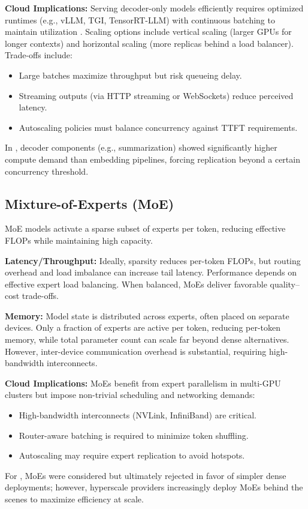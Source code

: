 \textbf{Cloud Implications:} Serving decoder-only models efficiently requires optimized runtimes (e.g., vLLM, TGI, TensorRT-LLM) with continuous batching to maintain utilization \cite{Kwon2023vLLM,tgi_docs,tensorrt_llm_docs}. Scaling options include vertical scaling (larger GPUs for longer contexts) and horizontal scaling (more replicas behind a load balancer). Trade-offs include: 
\begin{itemize}
  \item Large batches maximize throughput but risk queueing delay. 
  \item Streaming outputs (via HTTP streaming or WebSockets) reduce perceived latency.
  \item Autoscaling policies must balance concurrency against TTFT requirements.
\end{itemize}
In \ishtar{}, decoder components (e.g., summarization) showed significantly higher compute demand than embedding pipelines, forcing replication beyond a certain concurrency threshold.

\subsection{Mixture-of-Experts (MoE)}
MoE models activate a sparse subset of experts per token, reducing effective FLOPs while maintaining high capacity.

\textbf{Latency/Throughput:} Ideally, sparsity reduces per-token FLOPs, but routing overhead and load imbalance can increase tail latency. Performance depends on effective expert load balancing. When balanced, MoEs deliver favorable quality–cost trade-offs.

\textbf{Memory:} Model state is distributed across experts, often placed on separate devices. Only a fraction of experts are active per token, reducing per-token memory, while total parameter count can scale far beyond dense alternatives. However, inter-device communication overhead is substantial, requiring high-bandwidth interconnects.

\textbf{Cloud Implications:} MoEs benefit from expert parallelism in multi-GPU clusters but impose non-trivial scheduling and networking demands:
\begin{itemize}
  \item High-bandwidth interconnects (NVLink, InfiniBand) are critical.  
  \item Router-aware batching is required to minimize token shuffling.  
  \item Autoscaling may require expert replication to avoid hotspots.  
\end{itemize}
For \ishtar{}, MoEs were considered but ultimately rejected in favor of simpler dense deployments; however, hyperscale providers increasingly deploy MoEs behind the scenes to maximize efficiency at scale.

